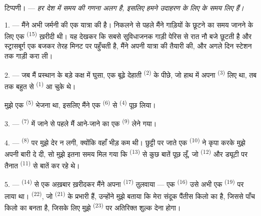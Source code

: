 
\VUsaut{4.0mm}
\VUsaut{2.4mm}
\VUsaut{3.4mm}
\textsc{टिप्पणी।} --- \textit{हर देश में समय की गणना अलग है, इसलिए हमने उदाहरण
के लिए}  \textit{के समय लिए हैं।}

1. --- मैंने अभी जर्मनी की एक यात्रा की है। निकलने से पहले मैंने गाड़ियों के
छूटने का समय जानने के लिए एक  \textsuperscript{(15)} ख़रीदी थी।
यह देखकर कि सबसे सुविधाजनक गाड़ी पेरिस से रात नौ बजे छूटती है और स्ट्रासबूर्ग
एक बजकर तेरह मिनट पर पहुँचती है, मैंने अपनी यात्रा की तैयारी की, और अगले दिन
स्टेशन तक गाड़ी करा ली।

2. --- जब मैं प्रस्थान के बड़े कक्ष में घुसा, एक बूढ़े देहाती 
\textsuperscript{(2)} के पीछे, जो हाथ में अपना 
\textsuperscript{(3)} लिए था, तब तक बहुत से  \textsuperscript{(1)} आ
चुके थे।

मुझे एक  \textsuperscript{(5)} भेजना था, इसलिए मैंने एक
 \textsuperscript{(6)} से  \textsuperscript{(4)}
पूछ लिया।

3. ---  \textsuperscript{(7)} में जाने से पहले मैं आने-जाने का
एक  \textsuperscript{(9)} लेने गया।

4. ---  \textsuperscript{(8)} पर मुझे देर न लगी, क्योंकि वहाँ
भीड़ कम थी। छुट्टी पर जाते एक  \textsuperscript{(10)} ने कृपा करके
मुझे अपनी बारी दे दी, सो मुझे इतना समय मिल गया कि
 \textsuperscript{(13)} से कुछ बातें पूछ लूँ, जो
 \textsuperscript{(12)} और ड्यूटी पर तैनात
 \textsuperscript{(11)} से बातें कर रहे थे।

\VUsaut{3.0mm}

5. ---  \textsuperscript{(14)} से एक अख़बार ख़रीदकर मैंने
अपना  \textsuperscript{(17)} तुलवाया — एक 
\textsuperscript{(16)} उसे अभी एक  \textsuperscript{(19)} पर
लाया था।  \textsuperscript{(22)}, जो 
\textsuperscript{(21)} के प्रभारी हैं, उन्होंने मुझे बताया कि मेरा संदूक पैंतीस किलो का है, जिससे पाँच
किलो का  बनता है, जिसके लिए मुझे
 \textsuperscript{(23)} पर अतिरिक्त शुल्क देना होगा।

